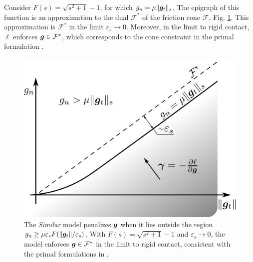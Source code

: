 Consider $F(s)=\sqrt{s^2+1}-1$, for which $g_n = \mu \Vert{\bm{g}}_t\Vert_s$. The
epigraph of this function is an approximation to the dual $\mathcal{F}^*$ of the
friction cone $\mathcal{F}$, Fig. \ref{fig:dual_cone}. This approximation is
$\mathcal{F}^*$ in the limit $\varepsilon_s\rightarrow 0$. Moreover, in the
limit to rigid contact, $\ell$ enforces ${\bm{g}} \in \mathcal{F}^*$, which
corresponds to the cone constraint in the primal formulation
\cite{bib:mazhar2014,bib:castro2022unconstrained}.

\begin{figure}[!h]
    \centering
    \includegraphics[width=0.6\columnwidth]{figures/similar_cones.png}
    \caption{The \emph{Similar} model penalizes ${\bm{g}}$ when it lies outside
    the region $g_n \ge \mu \varepsilon_sF(\Vert{\bm{g}}_t\Vert/\varepsilon_s)$.
    With $F(s)=\sqrt{s^2+1}-1$ and $\varepsilon_s\rightarrow 0$, the model
    enforces ${\bm{g}} \in \mathcal{F}^*$ in the limit to rigid contact,
    consistent with the primal formulations in
    \cite{bib:mazhar2014,bib:castro2022unconstrained}.}
    \label{fig:dual_cone}
\end{figure}

